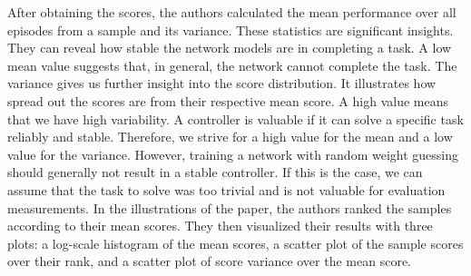 After obtaining the scores, the authors calculated the mean performance over all episodes from a sample and its variance. These statistics are significant insights. They can reveal how stable the network models are in completing a task. A low mean value suggests that, in general, the network cannot complete the task. The variance gives us further insight into the score distribution. It illustrates how spread out the scores are from their respective mean score. A high value means that we have high variability. A controller is valuable if it can solve a specific task reliably and stable. Therefore, we strive for a high value for the mean and a low value for the variance. However, training a network with random weight guessing should generally not result in a stable controller. If this is the case, we can assume that the task to solve was too trivial and is not valuable for evaluation measurements. In the illustrations of the paper, the authors ranked the samples according to their mean scores. They then visualized their results with three plots: a log-scale histogram of the mean scores, a scatter plot of the sample scores over their rank, and a scatter plot of score variance over the mean score.

